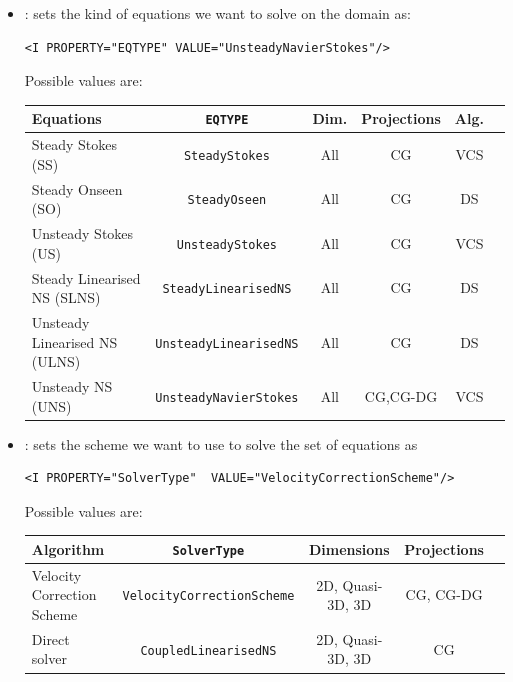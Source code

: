 \begin{itemize}
\item {}: sets the kind of equations we want to solve on the domain
as:

\begin{lstlisting}[style=XMLStyle]
<I PROPERTY="EQTYPE" VALUE="UnsteadyNavierStokes"/>
\end{lstlisting}

Possible values are:
\begin{center}
\footnotesize
\renewcommand\arraystretch{1.2}
\begin{tabular}{lccccc}
\toprule
{Equations} & {\texttt{EQTYPE}} &{Dim.}&{Projections} & Alg.\\
\midrule
Steady Stokes (SS)& \texttt{SteadyStokes} & All & CG &VCS \\
Steady Onseen (SO) & \texttt{SteadyOseen} & All & CG& DS \\
Unsteady Stokes (US) & \texttt{UnsteadyStokes} & All & CG &VCS \\
Steady Linearised NS (SLNS) & \texttt{SteadyLinearisedNS} & All & CG & DS \\
Unsteady Linearised NS (ULNS) & \texttt{UnsteadyLinearisedNS} & All & CG & DS \\
Unsteady NS (UNS) & \texttt{UnsteadyNavierStokes} & All & CG,CG-DG & VCS \\
\bottomrule
\end{tabular}
\end{center}


\item {}: sets the scheme we want to use to solve the set of
equations as
\begin{lstlisting}[style=XMLStyle]
<I PROPERTY="SolverType"  VALUE="VelocityCorrectionScheme"/>
\end{lstlisting}

Possible values are:
\begin{center}
\footnotesize
\begin{tabular}{lcccc}
\toprule
{Algorithm} & {\texttt{SolverType}} &{Dimensions}&{Projections} \\
\midrule
Velocity Correction Scheme & \texttt{VelocityCorrectionScheme} & 2D, Quasi-3D, 3D & CG, CG-DG\\
Direct solver & \texttt{CoupledLinearisedNS} & 2D, Quasi-3D, 3D &CG\\
\bottomrule
\end{tabular}
\end{center}


\end{itemize}
